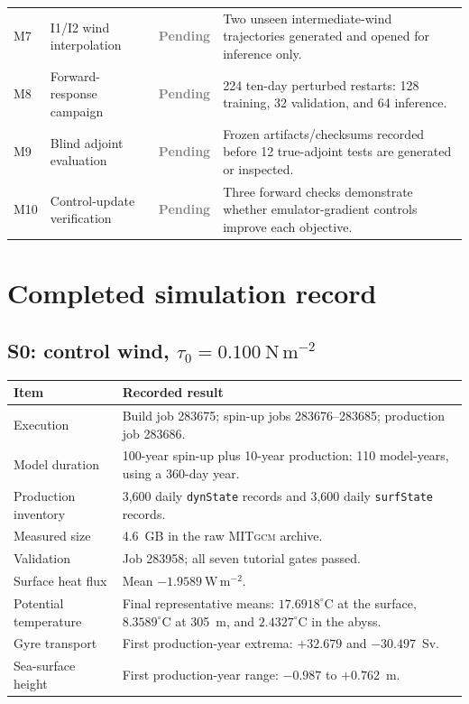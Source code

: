 \documentclass[11pt]{article}
\newcommand{\MITgcm}{\textsc{MITgcm}}
\newcommand{\Pending}{\textcolor{graytext}{\textbf{Pending}}}
\begin{document}
\begin{longtable}{@{}p{}p{}p{}p{}@{}}
M7 & I1/I2 wind interpolation & \Pending & Two unseen intermediate-wind trajectories generated and opened for inference only. \\
M8 & Forward-response campaign & \Pending & 224 ten-day perturbed restarts: 128 training, 32 validation, and 64 inference. \\
M9 & Blind adjoint evaluation & \Pending & Frozen artifacts/checksums recorded before 12 true-adjoint tests are generated or inspected. \\
M10 & Control-update verification & \Pending & Three forward checks demonstrate whether emulator-gradient controls improve each objective. \\
\bottomrule
\end{longtable}

\section{Completed simulation record}

\subsection{S0: control wind, \texorpdfstring{$\tau_0=0.100\ \mathrm{N\,m^{-2}}$}{tau0=0.100 N m-2}}

\begin{tabularx}{\textwidth}{@{}p{}Y@{}}
\toprule
\textbf{Item} & \textbf{Recorded result} \\
\midrule
Execution & Build job 283675; spin-up jobs 283676--283685; production job 283686. \\
Model duration & 100-year spin-up plus 10-year production: 110 model-years, using a 360-day year. \\
Production inventory & 3,600 daily \texttt{dynState} records and 3,600 daily \texttt{surfState} records. \\
Measured size & 4.6~GB in the raw \MITgcm{} archive. \\
Validation & Job 283958; all seven tutorial gates passed. \\
Surface heat flux & Mean $-1.9589\ \mathrm{W\,m^{-2}}$. \\
Potential temperature & Final representative means: $17.6918^\circ$C at the surface, $8.3589^\circ$C at 305~m, and $2.4327^\circ$C in the abyss. \\
Gyre transport & First production-year extrema: $+32.679$ and $-30.497$~Sv. \\
Sea-surface height & First production-year range: $-0.987$ to $+0.762$~m. \\
\bottomrule
\end{tabularx}
\end{document}
